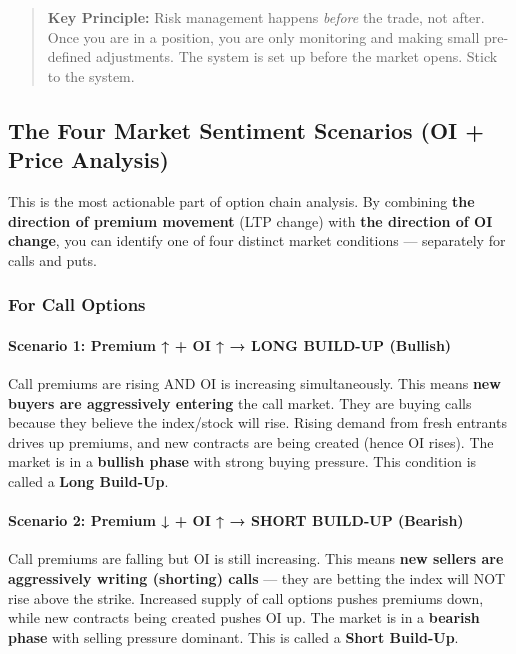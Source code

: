 \documentclass[12pt,openany]{book}
\begin{document}
\begin{quote}
\textbf{Key Principle:} Risk management happens \emph{before} the trade, not after. Once you are in a position, you are only monitoring and making small pre-defined adjustments. The system is set up before the market opens. Stick to the system.
\end{quote}


\subsection{The Four Market Sentiment Scenarios (OI + Price Analysis)}

This is the most actionable part of option chain analysis. By combining \textbf{the direction of premium movement} (LTP change) with \textbf{the direction of OI change}, you can identify one of four distinct market conditions — separately for calls and puts.

\subsubsection{For Call Options}

\paragraph{Scenario 1: Premium ↑ + OI ↑ → LONG BUILD-UP (Bullish)}

Call premiums are rising AND OI is increasing simultaneously. This means \textbf{new buyers are aggressively entering} the call market. They are buying calls because they believe the index/stock will rise. Rising demand from fresh entrants drives up premiums, and new contracts are being created (hence OI rises). The market is in a \textbf{bullish phase} with strong buying pressure. This condition is called a \textbf{Long Build-Up}.

\paragraph{Scenario 2: Premium ↓ + OI ↑ → SHORT BUILD-UP (Bearish)}

Call premiums are falling but OI is still increasing. This means \textbf{new sellers are aggressively writing (shorting) calls} — they are betting the index will NOT rise above the strike. Increased supply of call options pushes premiums down, while new contracts being created pushes OI up. The market is in a \textbf{bearish phase} with selling pressure dominant. This is called a \textbf{Short Build-Up}.
\end{document}
